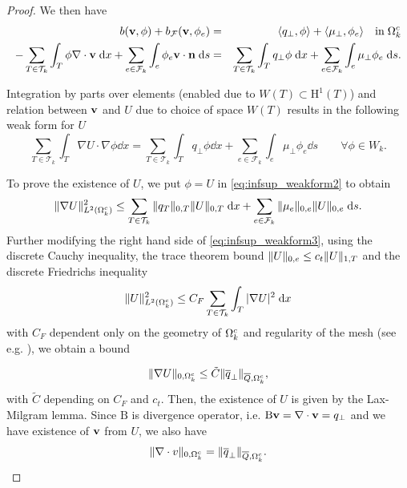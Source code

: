 \begin{proof}
We then have
\begin{eqnarray}
    b(\mathbf{v}, \phi) + b_{\mathcal{F}}(\mathbf{v}, \phi_e) &=& \langle q_\bot, \phi \rangle 
        + \langle \mu_\bot, \phi_e \rangle  \quad \mathrm{in}\;\Omega^c_k \nonumber\\
    -\sum_{T\in\mathcal{T}_k} \int_T \phi \nabla\cdot \mathbf{v} \; \mathrm{d} x 
    + \sum_{e\in\mathcal{F}_k} \int_e \phi_e \mathbf{v} \cdot \mathbf{n} \; \mathrm{d} s &=&
    \sum_{T\in\mathcal{T}_k} \int_T q_\bot \phi \; \mathrm{d} x 
    + \sum_{e\in\mathcal{F}_k} \int_e \mu_\bot \phi_e \; \mathrm{d} s. \label{eq:infsup_weakform1}
\end{eqnarray}%

Integration by parts over elements (enabled due to $W(T)\subset\mathrm{H}^1(T)$) 
and relation between $\mathbf{v}$ and $U$ due to choice of space $W(T)$
results in the following weak form for $U$
\begin{equation} \label{eq:infsup_weakform2}
 \sum_{T\in \mathcal{T}_k} \int_{T} \nabla U \cdot \nabla \phi \dd x = 
\sum_{T\in \mathcal{T}_k} \int_{T} q_\bot \phi \dd x + 
\sum_{e\in \mathcal{F}_k} \int_{e} \mu_\bot \phi_e \dd s \qquad 
\forall \phi\in W_k. 
\end{equation}

To prove the existence of $U$, we put $\phi = U$ in \eqref{eq:infsup_weakform2}
to obtain
\begin{equation} \label{eq:infsup_weakform3}
 \|\nabla U\|^2_{L^{2}(\Omega^c_k)} \leq
\sum_{T\in \mathcal{T}_k} \|q_T\|_{0,T} \|U\|_{0,T} \; \mathrm{d} x + 
\sum_{e\in \mathcal{F}_k} \|\mu_e\|_{0,e} \|U\|_{0,e} \; \mathrm{d} s.
\end{equation}
Further modifying the right hand side of \eqref{eq:infsup_weakform3}, 
using the discrete Cauchy inequality, the trace theorem bound 
$\|U\|_{0,e} \leq c_t\|U\|_{1,T}$ and the discrete Friedrichs inequality
\begin{equation*}
  \|U\|^2_{L^{2}(\Omega^c_k)} \le C_F 
\sum_{T\in\mathcal{T}_k} \int_T |\nabla U|^2 \; \mathrm{d} x
\end{equation*}
with $C_F$ dependent only on the geometry of $\Omega^c_k$ and regularity of 
the mesh (see e.g. \cite{Vohralik-2005-ODP}), we obtain a bound 

\begin{equation} \label{eq:infsup_estimate1}
\|\nabla U\|_{0,\Omega^c_k} \leq \tilde C \|\overline q_\bot\|_{\overline Q, \Omega^c_k},
\end{equation}
with $\tilde C$ depending on $C_F$ and $c_t$. Then, the existence  of $U$ 
is given by the Lax-Milgram lemma.
Since $\mathrm{B}$ is divergence operator, i.e. $\mathrm{B} \mathbf{v} = \nabla\cdot\mathbf{v}= q_\bot$ 
and we have existence of $\mathbf{v}$ from $U$, we also have
\begin{equation} \label{eq:infsup_estimate2}
\|\nabla\cdot v\|_{0,\Omega^c_k} = \|\overline q_\bot\|_{\overline Q,\Omega^c_k}.
\end{equation}


\end{proof}
